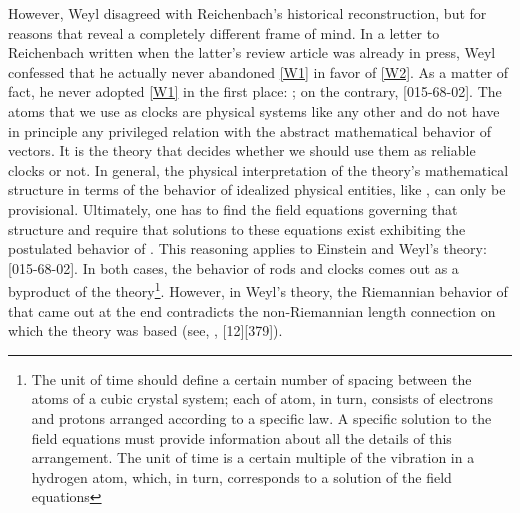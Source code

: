 \documentclass[draft]{article}
\newcommand{\WT}{Weyl's theory\xspace}
\begin{document}
However, Weyl disagreed with Reichenbach's historical reconstruction, but for reasons that reveal a completely different frame of mind. In a letter to Reichenbach written when the latter's review article was already in press, Weyl confessed that he actually never abandoned \ref{W1} in favor of \ref{W2}. As a matter of fact, he never adopted \ref{W1} in the first place: ; on the contrary,  [015-68-02]. The atoms that we use as clocks are physical systems like any other and do not have in principle any privileged relation with the abstract mathematical behavior of vectors. It is the theory that decides whether we should use them as reliable clocks or not. In general, the physical interpretation of the theory's mathematical structure in terms of the behavior of idealized physical entities, like \rac, can only be provisional. Ultimately, one has to find the field equations governing that structure and require that solutions to these equations exist exhibiting the postulated behavior of \rac. This reasoning applies to Einstein and \WT:  [015-68-02]. In both cases, the behavior of rods and clocks comes out as a byproduct of the theory\footnote{The unit of time should define a certain number of spacing between the atoms of a cubic crystal system; each of atom, in turn, consists of electrons and protons arranged according to a specific law. A specific solution to the field equations must provide information about all the details of this arrangement. The unit of time is a certain multiple of the vibration in a hydrogen atom, which, in turn, corresponds to a solution of the field equations}. However, in \WT, the Riemannian behavior of \rac that came out at the end contradicts the non-Riemannian length connection on which the theory was based (see, \eg, [12][379]).
\end{document}
